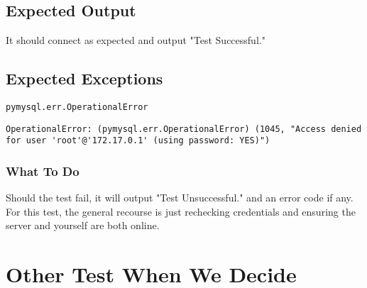 \documentclass[12pt]{article}
\begin{document}
\subsection{Expected Output}

It should connect as expected and output "Test Successful."

\subsection{Expected Exceptions}

\begin{verbatim}
pymysql.err.OperationalError
\end{verbatim}

\begin{lstlisting}
OperationalError: (pymysql.err.OperationalError) (1045, "Access denied for user 'root'@'172.17.0.1' (using password: YES)")
\end{lstlisting}

\subsubsection{What To Do}

Should the test fail, it will output "Test Unsuccessful." and an error code if any. For this test, the general recourse is just rechecking credentials and ensuring the server and yourself are both online.

\section{Other Test When We Decide}







\end{document}
